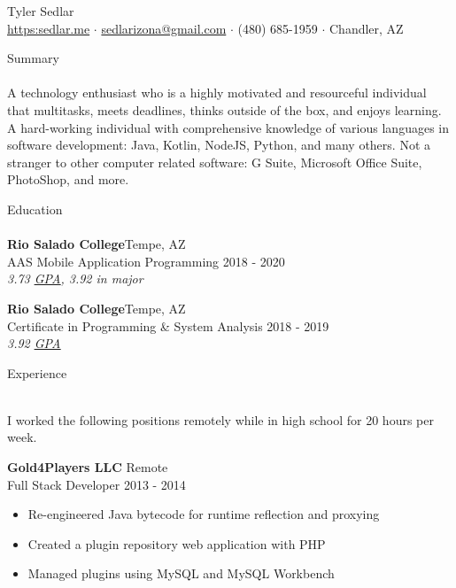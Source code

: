 \documentclass[a4paper]{article}
\newcommand{\lineunder} {
    \vspace*{-8pt} \\
    \hspace*{-18pt} \hrulefill \\
}
\newcommand{\header} [1] {
    {\hspace*{-18pt}\vspace*{6pt} {#1}}
    \vspace*{-6pt} \lineunder
}
\newcommand{\textslash}{/}
\begin{document}
\vspace*{-40pt}
\setul{}{0.25pt}

\vspace*{-10pt}
\begin{center}
	{\Huge {Tyler Sedlar}}\\
	\href{https://sedlar.me/}{https:\raisebox{1.1pt}{\textsc{\textbf{\textslash \textslash}}}sedlar.me} $\cdot$ \href{mailto:sedlarizona@gmail.com}{sedlarizona@gmail.com} $\cdot$ (480) 685-1959 $\cdot$ Chandler, AZ\\
\end{center}

\header{Summary}
A technology enthusiast who is a highly motivated and resourceful individual that multitasks, meets deadlines, thinks outside of the box, and enjoys learning.
A hard-working individual with comprehensive knowledge of various languages in software development: Java, Kotlin, NodeJS, Python, and many others.
Not a stranger to other computer related software: G Suite, Microsoft Office Suite, PhotoShop, and more.
\vspace{2mm}

\header{Education}
\textbf{Rio Salado College}\hfill Tempe, AZ\\
AAS Mobile Application Programming \hfill 2018 - 2020\\
\textit{3.73 \href{https://docs.google.com/spreadsheets/d/143DmVdsyjRVbH1ftcySxflvuNjioncAvJpj0vFbzpA8/edit?usp=sharing}{\ul{GPA}}, 3.92 in major}\\

\vspace{2mm}

\textbf{Rio Salado College}\hfill Tempe, AZ\\
Certificate in Programming \& System Analysis \hfill 2018 - 2019\\
\textit{3.92 \href{https://docs.google.com/spreadsheets/d/143DmVdsyjRVbH1ftcySxflvuNjioncAvJpj0vFbzpA8/edit?usp=sharing}{\ul{GPA}}}\\
\vspace{2mm}

\header{Experience}
\vspace{1mm}

I worked the following positions remotely while in high school for 20 hours per week.

\vspace{1mm}

\textbf{Gold4Players LLC} \hfill Remote\\
Full Stack Developer \hfill 2013 - 2014\\
\vspace{-3mm}
\begin{itemize} \itemsep 1pt
	\item Re-engineered Java bytecode for runtime reflection and proxying
	\vspace{-1mm}
	\item Created a plugin repository web application with PHP
	\vspace{-1mm}
	\item Managed plugins using MySQL and MySQL Workbench
\end{itemize}
\end{document}
